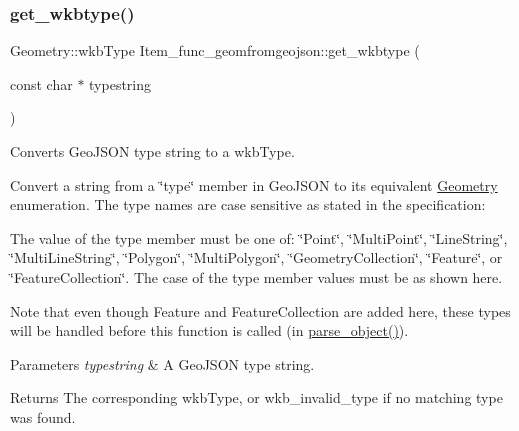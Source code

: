 \subsubsection{\texorpdfstring{get\+\_\+wkbtype()}{get\_wkbtype()}}
{\footnotesize\ttfamily Geometry\+::wkb\+Type Item\+\_\+func\+\_\+geomfromgeojson\+::get\+\_\+wkbtype (\begin{DoxyParamCaption}\item[{const char $\ast$}]{typestring }\end{DoxyParamCaption})}

Converts Geo\+J\+S\+ON type string to a wkb\+Type.

Convert a string from a \char`\"{}type\char`\"{} member in Geo\+J\+S\+ON to its equivalent \mbox{\hyperlink{classGeometry}{Geometry}} enumeration. The type names are case sensitive as stated in the specification\+:

The value of the type member must be one of\+: \char`\"{}\+Point\char`\"{}, \char`\"{}\+Multi\+Point\char`\"{}, \char`\"{}\+Line\+String\char`\"{}, \char`\"{}\+Multi\+Line\+String\char`\"{}, \char`\"{}\+Polygon\char`\"{}, \char`\"{}\+Multi\+Polygon\char`\"{}, \char`\"{}\+Geometry\+Collection\char`\"{}, \char`\"{}\+Feature\char`\"{}, or \char`\"{}\+Feature\+Collection\char`\"{}. The case of the type member values must be as shown here.

Note that even though Feature and Feature\+Collection are added here, these types will be handled before this function is called (in \mbox{\hyperlink{classItem__func__geomfromgeojson_a1a316ec406d1b5680851c727685f7d17}{parse\+\_\+object()}}).


\begin{DoxyParams}{Parameters}
{\em typestring} & A Geo\+J\+S\+ON type string.\\
\hline
\end{DoxyParams}
\begin{DoxyReturn}{Returns}
The corresponding wkb\+Type, or wkb\+\_\+invalid\+\_\+type if no matching type was found. 
\end{DoxyReturn}
\mbox{\label{classItem__func__geomfromgeojson_a9777cdac3777db91dc59474b8e63cab5}} 
